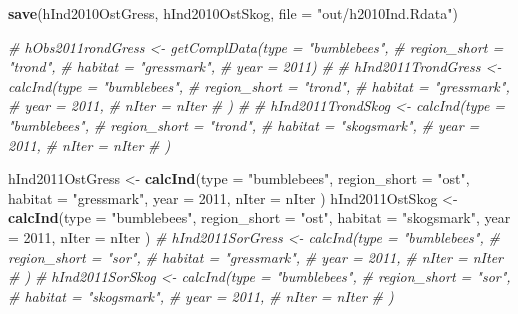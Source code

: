 \documentclass[]{article}
\newenvironment{Shaded}{\begin{snugshade}}{\end{snugshade}}
\newcommand{\KeywordTok}[1]{\textcolor[rgb]{0.13,0.29,0.53}{\textbf{#1}}}
\newcommand{\DataTypeTok}[1]{\textcolor[rgb]{0.13,0.29,0.53}{#1}}
\newcommand{\DecValTok}[1]{\textcolor[rgb]{0.00,0.00,0.81}{#1}}
\newcommand{\StringTok}[1]{\textcolor[rgb]{0.31,0.60,0.02}{#1}}
\newcommand{\CommentTok}[1]{\textcolor[rgb]{0.56,0.35,0.01}{\textit{#1}}}
\newcommand{\NormalTok}[1]{#1}
\begin{document}
\begin{Shaded}
\begin{Highlighting}[]
\KeywordTok{save}\NormalTok{(hInd2010OstGress, hInd2010OstSkog, }\DataTypeTok{file =} \StringTok{"out/h2010Ind.Rdata"}\NormalTok{)}
\end{Highlighting}
\end{Shaded}

\begin{Shaded}
\begin{Highlighting}[]
\CommentTok{# hObs2011rondGress <- getComplData(type = "bumblebees",}
\CommentTok{#                                    region_short = "trond",}
\CommentTok{#                                    habitat = "gressmark",}
\CommentTok{#                                    year = 2011)}
\CommentTok{# }
\CommentTok{# hInd2011TrondGress <- calcInd(type = "bumblebees",}
\CommentTok{#                               region_short = "trond",}
\CommentTok{#                               habitat = "gressmark",}
\CommentTok{#                               year = 2011,}
\CommentTok{#                               nIter = nIter}
\CommentTok{#                               )}
\CommentTok{#        }
\CommentTok{# hInd2011TrondSkog <- calcInd(type = "bumblebees",}
\CommentTok{#                               region_short = "trond",}
\CommentTok{#                               habitat = "skogsmark",}
\CommentTok{#                               year = 2011,}
\CommentTok{#                               nIter = nIter}
\CommentTok{#                               )}

\NormalTok{hInd2011OstGress <-}\StringTok{ }\KeywordTok{calcInd}\NormalTok{(}\DataTypeTok{type =} \StringTok{"bumblebees"}\NormalTok{,}
                              \DataTypeTok{region_short =} \StringTok{"ost"}\NormalTok{,}
                              \DataTypeTok{habitat =} \StringTok{"gressmark"}\NormalTok{,}
                              \DataTypeTok{year =} \DecValTok{2011}\NormalTok{,}
                              \DataTypeTok{nIter =}\NormalTok{ nIter}
\NormalTok{                              )}
\NormalTok{hInd2011OstSkog <-}\StringTok{ }\KeywordTok{calcInd}\NormalTok{(}\DataTypeTok{type =} \StringTok{"bumblebees"}\NormalTok{,}
                              \DataTypeTok{region_short =} \StringTok{"ost"}\NormalTok{,}
                              \DataTypeTok{habitat =} \StringTok{"skogsmark"}\NormalTok{,}
                              \DataTypeTok{year =} \DecValTok{2011}\NormalTok{,}
                              \DataTypeTok{nIter =}\NormalTok{ nIter}
\NormalTok{                              )}
\CommentTok{# hInd2011SorGress <- calcInd(type = "bumblebees",}
\CommentTok{#                               region_short = "sor",}
\CommentTok{#                               habitat = "gressmark",}
\CommentTok{#                               year = 2011,}
\CommentTok{#                               nIter = nIter}
\CommentTok{#                               )}
\CommentTok{# hInd2011SorSkog <- calcInd(type = "bumblebees",}
\CommentTok{#                               region_short = "sor",}
\CommentTok{#                               habitat = "skogsmark",}
\CommentTok{#                               year = 2011,}
\CommentTok{#                               nIter = nIter}
\CommentTok{#                               )}


\end{Highlighting}
\end{Shaded}
\end{document}
